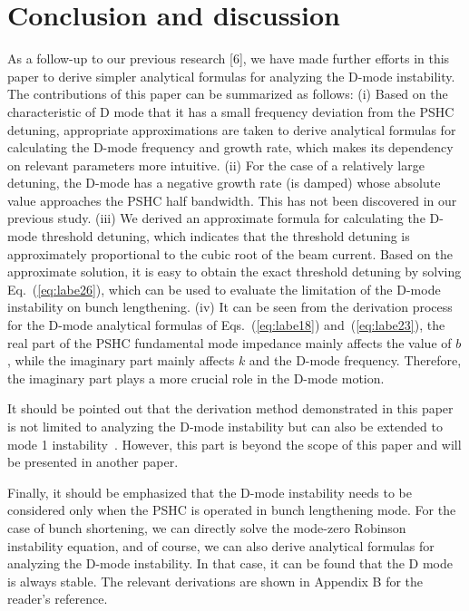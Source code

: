 \documentclass[%
 reprint,
 amsmath,amssymb,
 aps,
]{revtex4-1}
\begin{document}
\section{\label{sec:level5} Conclusion and discussion}
As a follow-up to our previous research [6], we have made further efforts in this paper to derive simpler analytical formulas for analyzing the D-mode instability. The contributions of this paper can be summarized as follows: (i) Based on the characteristic of D mode that it has a small frequency deviation from the PSHC detuning, appropriate approximations are taken to derive analytical formulas for calculating the D-mode frequency and growth rate, which makes its dependency on relevant parameters more intuitive. (ii) For the case of a relatively large detuning, the D-mode has a negative growth rate (is damped) whose absolute value approaches the PSHC half bandwidth. This has not been discovered in our previous study. (iii) We derived an approximate formula for calculating the D-mode threshold detuning, which indicates that the threshold detuning is approximately proportional to the cubic root of the beam current. Based on the approximate solution, it is easy to obtain the exact threshold detuning by solving Eq.~(\ref{eq:labe26}), which can be used to evaluate the limitation of the D-mode instability on bunch lengthening. (iv) It can be seen from the derivation process for the D-mode analytical formulas of Eqs.~(\ref{eq:labe18}) and~(\ref{eq:labe23}), the real part of the PSHC fundamental mode impedance mainly affects the value of $b$, while the imaginary part mainly affects $k$ and the D-mode frequency. Therefore, the imaginary part plays a more crucial role in the D-mode motion. 

It should be pointed out that the derivation method demonstrated in this paper is not limited to analyzing the D-mode instability but can also be extended to mode 1 instability~\cite{Marco19,He20}. However, this part is beyond the scope of this paper and will be presented in another paper.

Finally, it should be emphasized that the D-mode instability needs to be considered only when the PSHC is operated in bunch lengthening mode. For the case of bunch shortening, we can directly solve the mode-zero Robinson instability equation, and of course, we can also derive analytical formulas for analyzing the D-mode instability. In that case, it can be found that the D mode is always stable. The relevant derivations are shown in Appendix B for the reader's reference.
\end{document}
